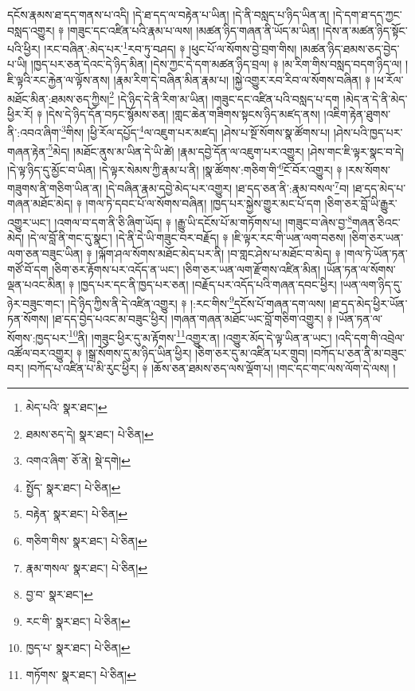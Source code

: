 དངོས་རྣམས་ཐ་དད་གནས་པ་འདི། །དེ་ཐ་དད་ལ་བརྟེན་པ་ཡིན། །དེ་ནི་བསླད་པ་ཉིད་ཡིན་ན། །དེ་དག་ཐ་དད་ཀྱང་བསླད་འགྱུར། ༈ །གཟུང་དང་འཛིན་པའི་རྣམ་པ་ལས། །མཚན་ཉིད་གཞན་ནི་ཡོད་མ་ཡིན། །དེས་ན་མཚན་ཉིད་སྟོང་པའི་ཕྱིར། །རང་བཞིན་:མེད་པར་\footnote{མེད་པའི་  སྣར་ཐང་། }རབ་ཏུ་བཤད། ༈ །ཕུང་པོ་ལ་སོགས་བྱེ་བྲག་གིས། །མཚན་ཉིད་ཐམས་ཅད་བྱེད་པ་ཡི། །ཁྱད་པར་ཅན་དེའང་དེ་ཉིད་མིན། །དེས་ཀྱང་དེ་དག་མཚན་ཉིད་བྲལ། ༈ །མ་རིག་གིས་བསླད་བདག་ཉིད་ལ། །ཇི་ལྟའི་རང་རྐྱེན་ལ་ལྟོས་ནས། །རྣམ་རིག་དེ་བཞིན་མིན་རྣམ་པ། །སྐྱེ་འགྱུར་རབ་རིབ་ལ་སོགས་བཞིན། ༈ །ཕ་རོལ་མཐོང་མིན་:ཐམས་ཅད་ཀྱིས།\footnote{ཐམས་ཅད་དེ།  སྣར་ཐང་།  པེ་ཅིན། } །དེ་ཉིད་དེ་ནི་རིག་མ་ཡིན། །གཟུང་དང་འཛིན་པའི་བསླད་པ་དག །མེད་ན་དེ་ནི་མེད་ཕྱིར་རོ། ༈ །དེས་དེ་ཉིད་དོན་བཏང་སྙོམས་ཅན། །གླང་ཆེན་གཟིགས་སྟངས་ཉིད་མཛད་ནས། །འཇིག་རྟེན་ཐུགས་ནི་:འབའ་ཞིག་\footnote{འགའ་ཞིག་  ཅོ་ནེ།  སྡེ་དགེ། }གིས། །ཕྱི་རོལ་དཔྱོད་\footnote{སྤྱོད་  སྣར་ཐང་།  པེ་ཅིན། }ལ་འཇུག་པར་མཛད། །ཤེས་པ་སྔོ་སོགས་སྣ་ཚོགས་པ། །ཤེས་པའི་ཁྱད་པར་གཞན་རྟེན་\footnote{བརྟེན་  སྣར་ཐང་།  པེ་ཅིན། }མེད། །མཐོང་ནུས་མ་ཡིན་དེ་ཡི་ཚེ། །རྣམ་དབྱེ་དོན་ལ་འཇུག་པར་འགྱུར། །ཤེས་གང་ཇི་ལྟར་སྣང་བ་དེ། །དེ་ལྟ་ཉིད་དུ་མྱོང་བ་ཡིན། །དེ་ལྟར་སེམས་ཀྱི་རྣམ་པ་ནི། །སྣ་ཚོགས་:གཅིག་གི་\footnote{གཅིག་གིས་  སྣར་ཐང་།  པེ་ཅིན། }ངོ་བོར་འགྱུར། ༈ །རས་སོགས་གཟུགས་ནི་གཅིག་ཡིན་ན། །དེ་བཞིན་རྣམ་དབྱེ་མེད་པར་འགྱུར། །ཐ་དད་ཅན་ནི་:རྣམ་བསལ་\footnote{རྣམ་གསལ་  སྣར་ཐང་།  པེ་ཅིན། }བ། །ཐ་དད་མེད་པ་གཞན་མཐོང་མེད། ༈ །གལ་ཏེ་དབང་པོ་ལ་སོགས་བཞིན། །ཁྱད་པར་སྐྱེས་གྱུར་མང་པོ་དག །ཅིག་ཅར་བློ་ཡི་རྒྱུར་འགྱུར་ཡང་། །འགལ་བ་དག་ནི་ཅི་ཞིག་ཡོད། ༈ །རྒྱུ་ཡི་དངོས་པོ་མ་གཏོགས་པ། །གཟུང་བ་ཞེས་བྱ་\footnote{བྱ་བ་  སྣར་ཐང་། }གཞན་ཅིའང་མེད། །དེ་ལ་བློ་ནི་གང་དུ་སྣང་། །དེ་ནི་དེ་ཡི་གཟུང་བར་བརྗོད། ༈ །ཇི་ལྟར་རང་གི་ཡན་ལག་བཅས། །ཅིག་ཅར་ཡན་ལག་ཅན་བཟུང་ཡིན། ༈ །ལྐོག་ཤལ་སོགས་མཐོང་མེད་པར་ནི། །བ་གླང་ཤེས་པ་མཐོང་བ་མེད། ༈ །གལ་ཏེ་ཡོན་ཏན་གཙོ་བོ་དག །ཅིག་ཅར་རྟོགས་པར་འདོད་ན་ཡང་། །ཅིག་ཅར་ཡན་ལག་རྫོགས་འཛིན་མིན། །ཡོན་ཏན་ལ་སོགས་ལྡན་པའང་མིན། ༈ །ཁྱད་པར་དང་ནི་ཁྱད་པར་ཅན། །བརྗོད་པར་འདོད་པའི་གཞན་དབང་ཕྱིར། །ཡན་ལག་ཉིད་དུ་ཉེར་བཟུང་གང་། །དེ་ཉིད་ཀྱིས་ནི་དེ་འཛིན་འགྱུར། ༈ །:རང་གིས་\footnote{རང་གི་  སྣར་ཐང་།  པེ་ཅིན། }དངོས་པོ་གཞན་དག་ལས། །ཐ་དད་མེད་ཕྱིར་ཡོན་ཏན་སོགས། །ཐ་དད་བྱེད་པའང་མ་བཟུང་ཕྱིར། །གཞན་གཞན་མཐོང་ཡང་བློ་གཅིག་འགྱུར། ༈ །ཡོན་ཏན་ལ་སོགས་:ཁྱད་པར་\footnote{ཁྱད་པ་  སྣར་ཐང་།  པེ་ཅིན། }ནི། །གཟུང་ཕྱིར་དུ་མ་རྟོགས་\footnote{གཏོགས་  སྣར་ཐང་།  པེ་ཅིན། }འགྱུར་ན། །འགྱུར་མོད་དེ་ལྟ་ཡིན་ན་ཡང་། །འདི་དག་གི་འབྲེལ་འཚོལ་བར་འགྱུར། ༈ །སྒྲ་སོགས་དུ་མ་ཉིད་ཡིན་ཕྱིར། །ཅིག་ཅར་དུ་མ་འཛིན་པར་གྲུབ། །བཀོད་པ་ཅན་ནི་མ་བཟུང་བར། །བཀོད་པ་འཛིན་པ་མི་རུང་ཕྱིར། ༈ །ཆོས་ཅན་ཐམས་ཅད་ལས་ལྡོག་པ། །གང་དང་གང་ལས་ལོག་དེ་ལས། །
